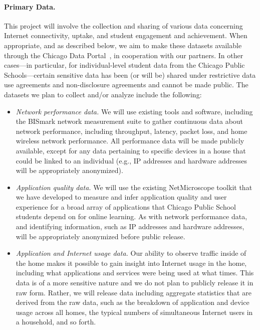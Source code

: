 \paragraph{Primary Data.} This project will involve the collection and sharing
of various data concerning Internet connectivity, uptake, and student
engagement and achievement. When appropriate, and as described below, we aim
to make these datasets available through the Chicago Data
Portal~\cite{www-chicago-data}, in cooperation with our partners. In other
cases---in particular, for individual-level student data from the Chicago Public
Schools---certain sensitive data has been (or will be) shared under
restrictive data use agreements and non-disclosure agreements and cannot be
made public.  The datasets we plan to collect and/or analyze include the
following:
\begin{itemize}
    \itemsep=-1pt
    \item {\em Network performance data.} We will use existing tools and
        software, including the BISmark network measurement suite to gather
        continuous data about network performance, including throughput,
        latency, packet loss, and home wireless network performance.  All
        performance data will be made publicly available, except for any data
        pertaining to specific devices in a house that could be linked to an
        individual (e.g., IP addresses and hardware addresses will be
        appropriately anonymized).
    \item {\em Application quality data.} We will use the existing
        NetMicroscope toolkit that we have developed to measure and infer
        application quality and user experience for a broad array of
        applications that Chicago Public School students depend on for online
        learning. As with network performance data, and identifying
        information, such as IP addresses and hardware addresses, will be
        appropriately anonymized before public release.
    \item {\em Application and Internet usage data.} Our ability to observe
        traffic inside of the home makes it possible to gain insight into
        Internet usage in the home, including what applications and services
        were being used at what times. This data is of a more sensitive nature
        and we do not plan to publicly release it in raw form. Rather, we will
        release data including aggregate statistics that are derived from the
        raw data, such as the breakdown of application and device usage across
        all homes, the typical numbers of simultaneous Internet users in a
        household, and so forth.
\end{itemize}

